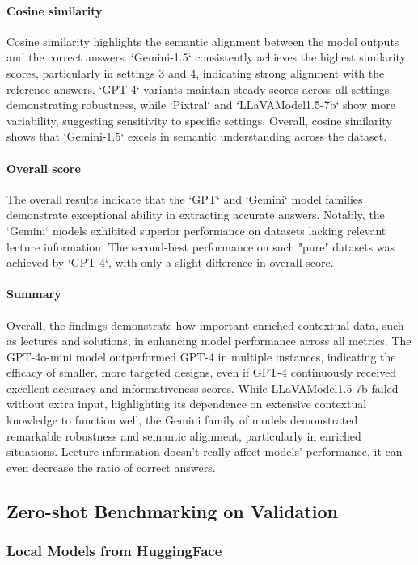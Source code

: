 \documentclass{article}
\begin{document}
\paragraph{Cosine similarity}
Cosine similarity highlights the semantic alignment between the model outputs and the correct answers. `Gemini-1.5` consistently achieves the highest similarity scores, particularly in settings 3 and 4, indicating strong alignment with the reference answers. `GPT-4` variants maintain steady scores across all settings, demonstrating robustness, while `Pixtral` and `LLaVAModel1.5-7b` show more variability, suggesting sensitivity to specific settings. Overall, cosine similarity shows that `Gemini-1.5` excels in semantic understanding across the dataset.

\paragraph{Overall score}
The overall results indicate that the `GPT` and `Gemini` model families demonstrate exceptional ability in extracting accurate answers. Notably, the `Gemini` models exhibited superior performance on datasets lacking relevant lecture information. The second-best performance on such "pure" datasets was achieved by `GPT-4`, with only a slight difference in overall score.

\paragraph{Summary}
Overall, the findings demonstrate how important enriched contextual data, such as lectures and solutions, in enhancing model performance across all metrics. The GPT-4o-mini model outperformed GPT-4 in multiple instances, indicating the efficacy of smaller, more targeted designs, even if GPT-4 continuously received excellent accuracy and informativeness scores. While LLaVAModel1.5-7b failed without extra input, highlighting its dependence on extensive contextual knowledge to function well, the Gemini family of models demonstrated remarkable robustness and semantic alignment, particularly in enriched situations.
Lecture information doesn’t really affect models’ performance, it can even decrease the ratio of correct answers.


\subsection{Zero-shot Benchmarking on Validation}
\subsubsection{Local Models from HuggingFace}
\end{document}
